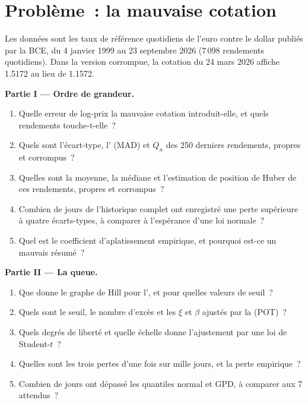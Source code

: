 \section{Problème~: la mauvaise cotation}

\begin{problem}\label{pb:qm:robust-statistics-and-heavy-tails:1}
Les données sont les taux de référence quotidiens de l'euro contre le dollar publiés par la BCE, du 4 janvier 1999 au 23 septembre 2026 (7\,098 rendements quotidiens). Dans la
version corrompue, la cotation du 24 mars 2026 affiche 1.5172 au lieu de 1.1572.

\medskip\noindent\textbf{Partie I --- Ordre de grandeur.}
\begin{enumerate}
\item Quelle erreur de log-prix la mauvaise cotation introduit-elle, et quels rendements touche-t-elle~?
\item Quels sont l'écart-type, l' (MAD) et $Q_n$ des 250 derniers rendements, propres et corrompus~?
\item Quelles sont la moyenne, la médiane et l'estimation de position de Huber de ces rendements, propres et corrompus~?
\item Combien de jours de l'historique complet ont enregistré une perte supérieure à quatre écarts-types, à comparer à l'espérance d'une loi normale~?
\item Quel est le coefficient d'aplatissement empirique, et pourquoi est-ce un mauvais résumé~?
\end{enumerate}

\medskip\noindent\textbf{Partie II --- La queue.}
\begin{enumerate}[resume]
\item Que donne le graphe de Hill pour l', et pour quelles valeurs de seuil~?
\item Quels sont le seuil, le nombre d'excès et les $\xi$ et $\beta$ ajustés par la  (POT)~?
\item Quels degrés de liberté et quelle échelle donne l'ajustement par une loi de Student-$t$~?
\item Quelles sont les trois pertes d'une fois sur mille jours, et la perte empirique~?
\item Combien de jours ont dépassé les quantiles normal et GPD, à comparer aux 7 attendus~?
\end{enumerate}


\end{problem}
